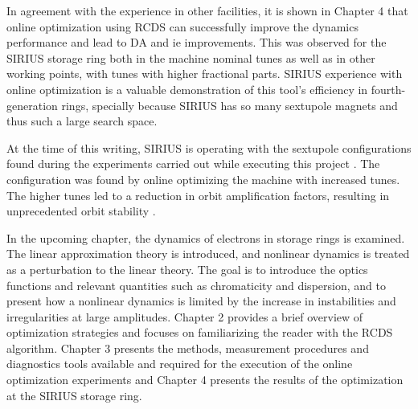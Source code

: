 In agreement with the experience in other facilities, it is shown in Chapter 4 that online optimization using \gls*{RCDS} can successfully improve the dynamics performance and lead to \gls*{DA} and \gls*{ie} improvements. This was observed for the SIRIUS storage ring both in the machine nominal tunes as well as in other working points, with tunes with higher fractional parts.  SIRIUS experience with online optimization is a valuable demonstration of this tool's efficiency in fourth-generation rings, specially because SIRIUS has so many sextupole magnets and thus such a large search space.

At the time of this writing, SIRIUS is operating with the sextupole configurations found during the experiments carried out while executing this project \cite{velloso_online_2023}. The configuration was found by online optimizing the machine with increased tunes. The higher tunes led to a reduction in orbit amplification factors, resulting in unprecedented orbit stability \cite{liu_status_2023}.

In the upcoming chapter, the dynamics of electrons in storage rings is examined. The linear approximation theory is introduced, and nonlinear dynamics is treated as a perturbation to the linear theory. The goal is to introduce the optics functions and relevant quantities such as chromaticity and dispersion, and to present how a nonlinear dynamics is limited by the increase in instabilities and irregularities at large amplitudes. Chapter 2 provides a brief overview of optimization strategies and focuses on familiarizing the reader with the \gls*{RCDS} algorithm. Chapter 3 presents the methods, measurement procedures and diagnostics tools available and required for the execution of the online optimization experiments and Chapter 4 presents the results of the optimization at the SIRIUS storage ring.
    